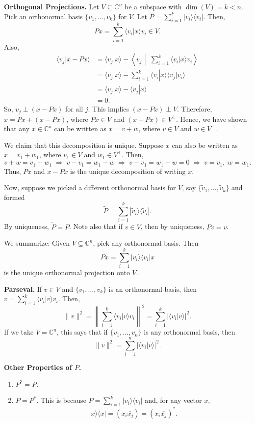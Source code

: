 \documentclass[12pt]{article}
\theoremstyle{definition}
\newcommand{\braket}[2]{\langle #1|#2\rangle}
\newcommand{\ketbra}[2]{|#1\rangle\langle #2|}
\newcommand{\norm}[1]{\|#1\|}
\newcommand{\C}{\mathbb{C}}
\begin{document}
\textbf{Orthogonal Projections.} Let $V \subseteq \C^n$ be a subspace with $\dim(V) = k < n$. Pick an orthonormal basis $\{v_1,\ldots,v_k\}$ for $V$. Let $P = \sum_{i=1}^k \ketbra{v_i}{v_i}$. Then,
\[
Px = \sum_{i=1}^k \braket{v_i}{x} v_i \in V.
\]
Also,
\begin{align*}
\braket{v_j}{x - Px} &= \braket{v_j}{x} - \left\langle v_j \,\middle|\, \sum_{i=1}^k \braket{v_i}{x} v_i \right\rangle \\
&= \braket{v_j}{x} - \sum_{i=1}^k \braket{v_i}{x}\braket{v_j}{v_i} \\
&= \braket{v_j}{x} - \braket{v_j}{x} \\
&= 0.
\end{align*}
So, $v_j \perp (x-Px)$ for all $j$. This implies $(x-Px) \perp V$. Therefore, $x = Px + (x-Px)$, where $Px \in V$ and $(x-Px) \in V^\perp$. Hence, we have shown that any $x \in \C^n$ can be written as $x = v + w$, where $v \in V$ and $w \in V^\perp$.

We claim that this decomposition is unique. Suppose $x$ can also be written as $x = v_1 + w_1$, where $v_1 \in V$ and $w_1 \in V^\perp$. Then,
\[
v + w = v_1 + w_1 \;\Rightarrow\; v - v_1 = w_1 - w \;\Rightarrow\; v - v_1 = w_1 - w = 0 \;\Rightarrow\; v = v_1,\; w = w_1.
\]
Thus, $Px$ and $x-Px$ is the unique decomposition of writing $x$.

Now, suppose we picked a different orthonormal basis for $V$, say $\{\tilde{v}_1,\ldots,\tilde{v}_k\}$ and formed
\[
\tilde{P} = \sum_{i=1}^k \ketbra{\tilde{v}_i}{\tilde{v}_i}.
\]
By uniqueness, $\tilde{P} = P$. Note also that if $v \in V$, then by uniqueness, $Pv = v$.

We summarize: Given $V \subseteq \C^n$, pick any orthonormal basis. Then
\[
Px = \sum_{i=1}^k \ketbra{v_i}{v_i} x
\]
is the unique orthonormal projection onto $V$.

\textbf{Parseval.} If $v \in V$ and $\{v_1,\ldots,v_k\}$ is an orthonormal basis, then $v = \sum_{i=1}^k \braket{v_i}{v} v_i$. Then,
\[
\norm{v}^2 = \left\|\sum_{i=1}^k \braket{v_i}{v} v_i\right\|^2 = \sum_{i=1}^k |\braket{v_i}{v}|^2.
\]
If we take $V = \C^n$, this says that if $\{v_1,\ldots,v_n\}$ is any orthonormal basis, then
\[
\norm{v}^2 = \sum_{i=1}^n |\braket{v_i}{v}|^2.
\]

\textbf{Other Properties of $P$.}
\begin{enumerate}
\item $P^2 = P$.
\item $P = P^*$. This is because $P = \sum_{i=1}^k \ketbra{v_i}{v_i}$ and, for any vector $x$,
\[
\ketbra{x}{x} = (x_i \overline{x_j}) = (x_i \overline{x_j})^*.
\]
\end{enumerate}
\end{document}
